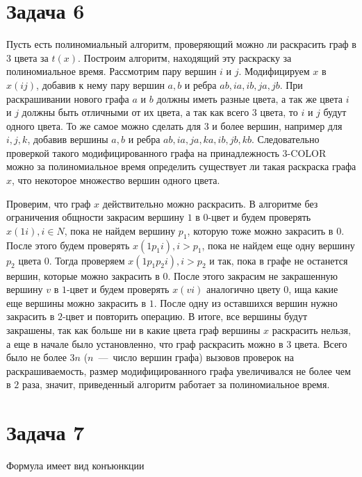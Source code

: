 \documentclass[a4paper,12pt]{article} %
\begin{document}
\section{Задача 6}
\hspace{5mm}
Пусть есть полиномиальный алгоритм, проверяющий можно ли раскрасить граф в $3$ цвета за $t(x)$. Построим алгоритм, находящий эту раскраску за полиномиальное время. Рассмотрим пару вершин $i$ и $j$. Модифицируем $x$ в $x(ij)$, добавив к нему пару вершин $a,b$ и ребра $ab,ia,ib,ja,jb$. При раскрашивании нового графа $a$ и $b$ должны иметь разные цвета, а так же цвета $i$ и $j$ должны быть отличными от их цвета, а так как всего $3$ цвета, то $i$ и $j$  будут одного цвета. То же самое можно сделать для $3$ и более вершин, например для $i,j,k$, добавив вершины $a,b$ и ребра $ab,ia,ja,ka,ib,jb,kb$. Следовательно проверкой такого модифицированного графа на принадлежность $3$-COLOR можно за полиномиальное время определить существует ли такая раскраска графа $x$, что некоторое множество вершин одного цвета. 

Проверим, что граф $x$ действительно можно раскрасить. В алгоритме без ограничения общности закрасим вершину $1$ в $0$-цвет и будем проверять $x(1i),i\in N$, пока не найдем вершину $p_1$, которую тоже можно закрасить в $0$. После этого будем проверять $x(1 p_1 i), i>p_1$, пока не найдем еще одну вершину $p_2$ цвета $0$. Тогда проверяем $x(1 p_1 p_2 i), i>p_2$ и так, пока в графе не останется вершин, которые можно закрасить в $0$. После этого закрасим не закрашенную вершину $v$ в $1$-цвет и будем проверять $x(v i)$ аналогично цвету $0$, ища какие еще вершины можно закрасить в $1$. После одну из оставшихся вершин нужно закрасить в $2$-цвет и повторить операцию. В итоге, все вершины будут закрашены, так как больше ни в какие цвета граф вершины $x$ раскрасить нельзя, а еще в начале было установленно, что граф раскрасить можно в $3$ цвета. Всего было не более $3n$ ($n$~---~число вершин графа) вызовов проверок на раскрашиваемость, размер модифицированного графа увеличивался не более чем в $2$ раза, значит, приведенный алгоритм работает за полиномиальное время.

\section{Задача 7}
\hspace{5mm}
Формула имеет вид конъюнкции
\end{document}
